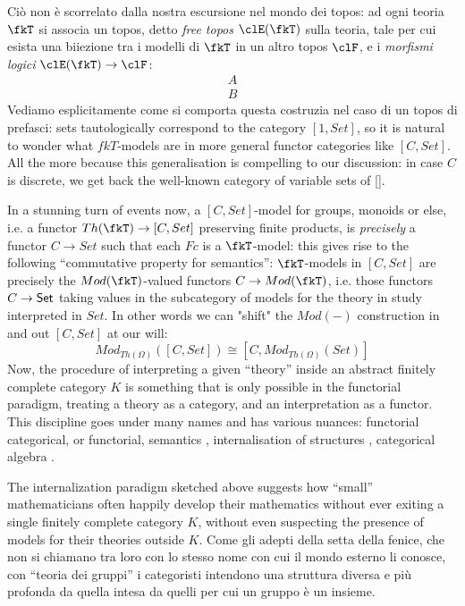 Ciò non è scorrelato dalla nostra escursione nel mondo dei topos: ad ogni teoria $\fkT$ si associa un topos, detto \emph{free topos} $\clE(\fkT)$ sulla teoria, tale per cui esista una biiezione tra i modelli di $\fkT$ in un altro topos $\clF$, e i \emph{morfismi logici} $\clE(\fkT) \to \clF$:
\[\begin{array}{c}
  A \\ \hline  B
\end{array}\]
Vediamo esplicitamente come si comporta questa costruzia nel caso di un topos di prefasci: sets tautologically correspond to the category $[1,Set]$, so it is natural to wonder what $fkT$-models are in more general functor categories like $[C,Set]$. All the more because this generalisation is compelling to our discussion: in case $C$ is discrete, we get back the well-known category of variable sets of \ref{}.

In a stunning turn of events now, a $[C,Set]$-model for groups, monoids or else, i.e. a functor $Th(\fkT)\to [C,Set]$ preserving finite products, is \emph{precisely} a functor $C\to Set$ such that each $Fc$ is a $\fkT$-model: this gives rise to the following ``commutative property for semantics'': $\fkT$-models in $[C,Set]$ are precisely the $Mod(\fkT)$-valued functors $C\to Mod(\fkT)$, i.e. those functors $C \to \mathsf{Set}$ taking values in the subcategory of models for the theory in study interpreted in $Set$. In other words we can "shift" the $Mod(-)$ construction in and out $[C,Set]$ at our will:
\[ 
  Mod_{Th(\Omega)}([C,Set]) \cong [C, Mod_{Th(\Omega)}(Set)]
\]
Now, the procedure of interpreting a given ``theory'' inside an abstract finitely complete category $K$ is something that is only possible in the functorial paradigm, treating a theory as a category, and an interpretation as a functor. This discipline goes under many names and has various nuances: functorial categorical, or functorial, semantics \cite{}, internalisation of structures \cite{}, categorical algebra \cite{}.

The internalization paradigm sketched above suggests how ``small'' mathematicians often happily develop their mathematics without ever exiting a single finitely complete category $K$, without even suspecting the presence of models for their theories outside $K$. Come gli adepti della setta della fenice, che non si chiamano tra loro con lo stesso nome con cui il mondo esterno li conosce, con ``teoria dei gruppi'' i categoristi intendono una struttura diversa e più profonda da quella intesa da quelli per cui un gruppo è un insieme.

